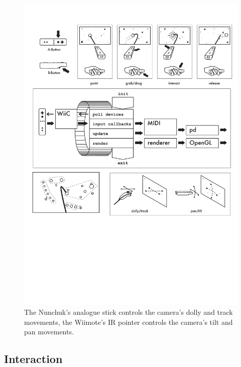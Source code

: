 \documentclass[10pt,a4paper]{scrartcl}
\begin{document}
\begin{figure}[hbtp]
\begin{center}
\includegraphics[width=0.7\columnwidth]{img/navigation}
\caption{The Nunchuk's analogue stick controls the camera's dolly and track movements, the Wiimote's IR pointer controls the camera's tilt and pan movements.}
\label{fig:sputnik-navigation}
\end{center}
\end{figure}



\subsection{Interaction}
\end{document}
